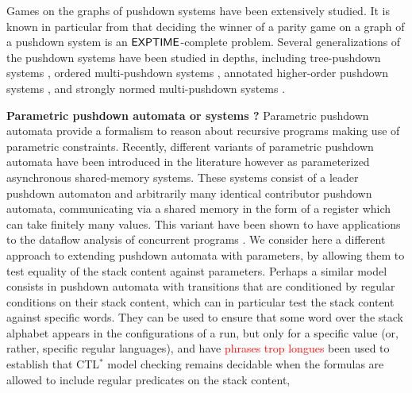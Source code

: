 \documentclass[a4paper,UKenglish,cleveref, autoref, thm-restate]{lipics-v2021}
\begin{document}
Games on the graphs of pushdown systems have been extensively studied.
It is known in particular from \cite{walukiewicz1996pushdown} that deciding the winner of a parity game on a graph of a pushdown system is an ${\sf EXPTIME}$-complete problem.
Several generalizations of the pushdown systems 
have been studied in depths, including
tree-pushdown systems \cite{guessarian1983pushdown}, ordered
multi-pushdown systems \cite{breveglieri1996multi, atig2012model}, annotated higher-order pushdown systems \cite{maslov1976multilevel, broadbent2012saturation}, and
strongly normed multi-pushdown systems \cite{czerwinski2012reachability}.



{\bf Parametric pushdown automata or systems ?}
 Parametric pushdown automata provide a  formalism to
reason about 
recursive programs
making use of parametric constraints.
Recently, different variants of parametric pushdown automata have been introduced in the literature 
\cite{hague2011parameterised, esparza2016parameterized, fortin2017model} 
however as
parameterized asynchronous shared-memory systems.
These systems consist of a leader pushdown automaton
and arbitrarily many identical contributor pushdown automata, communicating via a shared memory
in the form of a register which can take finitely many values.
This variant have been shown to have applications
to the dataflow analysis of concurrent programs \cite{kahlon2008parameterization}. 
We consider here a different approach to extending pushdown automata with parameters, by allowing them to test equality of the stack content against parameters.
Perhaps a similar model consists in 
pushdown automata 
with transitions that are conditioned by regular conditions on their stack content, which
can in particular
test the
stack content against
specific words. 
They can be used to ensure that some word over the stack alphabet appears in the configurations of a run, but only for a specific value (or, rather, specific regular languages),
and have \textcolor{red}{ phrases trop longues}
been used to establish that CTL$^*$ model checking remains decidable
when the formulas are allowed to include regular predicates on the stack content,
\end{document}
